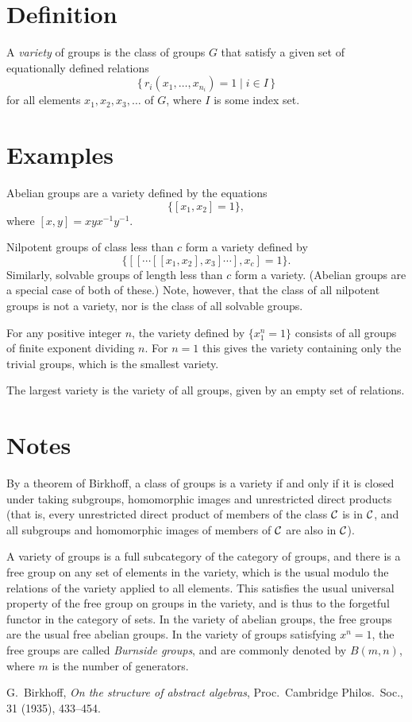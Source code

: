 \documentclass[12pt]{article}
\begin{document}

\section*{Definition}

A \emph{variety} of groups is the class of groups $G$
that satisfy a given set of equationally defined relations 
\[
  \{\, r_i(x_1,\ldots,x_{n_i})=1 \mid i\in I \,\}
\]
for all elements $x_1,x_2,x_3,\ldots$ of $G$,
where $I$ is some index set.

\section*{Examples}

Abelian groups are a variety defined by the equations
$$\{[x_1,x_2]=1\},$$
where $[x,y]=xyx^{-1}y^{-1}$.

Nilpotent groups of class less than $c$ form a variety defined by
$$\{[[\cdots[[x_1,x_2],x_3]\cdots],x_c]=1\}.$$
Similarly, solvable groups of length less than $c$ form a variety.
(Abelian groups are a special case of both of these.)
Note, however, that the class of all nilpotent groups is not a variety,
nor is the class of all solvable groups.

For any positive integer $n$,
the variety defined by $\{x_1^n=1\}$
consists of all groups of finite exponent dividing $n$.
For $n=1$ this gives the variety containing only the trivial groups,
which is the smallest variety.

The largest variety is the variety of all groups,
given by an empty set of relations.

\section*{Notes}

By a theorem of Birkhoff\cite{birkhoff},
a class of groups is a variety if and only if
it is closed under taking subgroups, homomorphic images
and unrestricted direct products
(that is,
every unrestricted direct product of members
of the class $\cal C$ is in $\cal C$,
and all subgroups and homomorphic images of members of $\cal C$
are also in $\cal C$).

A variety of groups is a full subcategory of the category of groups,
and there is a free group on any set of elements in the variety,
which is the usual 
modulo the relations of the variety applied to all elements.
This satisfies the usual universal property
of the free group on groups in the variety,
and is thus  to the forgetful functor
in the category of sets.
In the variety of abelian groups,
the free groups are the usual free abelian groups.
In the variety of groups satisfying $x^n=1$,
the free groups are called \emph{Burnside groups},
and are commonly denoted by $B(m,n)$, where $m$ is the number of generators.

\begin{thebibliography}{9}
 G.\ Birkhoff,
 {\it On the structure of abstract algebras},
 Proc.\ Cambridge Philos.\ Soc., 31 (1935), 433--454.
\end{thebibliography}
\end{document}
